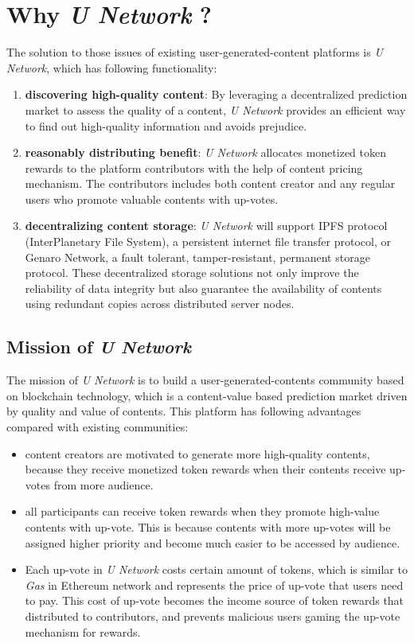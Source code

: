 \section{Why \emph{U Network} ?}
The solution to those issues of existing user-generated-content platforms is \emph{U Network}, which has following functionality:
\begin{enumerate}
    
    \item \textbf{discovering high-quality content}: By leveraging a decentralized prediction market to assess the quality of a content, \emph{U Network} provides an efficient way to find out high-quality information and avoids prejudice.    
    \item \textbf{reasonably distributing benefit}:  \emph{U Network} allocates monetized token rewards to the platform contributors with the help of content pricing mechanism. The contributors includes both content creator and any regular users who promote valuable contents with up-votes.
    
    \item \textbf{decentralizing content storage}: \emph{U Network} will support IPFS protocol (InterPlanetary File System\cite{ipfs}), a persistent internet file transfer protocol, or Genaro Network, a fault tolerant, tamper-resistant, permanent storage protocol. These decentralized storage solutions not only improve the reliability of data integrity but also guarantee the availability of contents using redundant copies across distributed server nodes.       
\end{enumerate}

\subsection{Mission of \emph{U Network}}
The mission of \emph{U Network} is to build a user-generated-contents community based on blockchain technology, which is a content-value based prediction market driven by quality and value of contents. This platform has following advantages compared with existing communities:
\begin{itemize}
\item content creators are motivated to generate more high-quality contents, because they receive monetized token rewards when their contents receive up-votes from more audience. 
\item all participants can receive token rewards when they promote high-value contents with up-vote. This is because contents with more up-votes will be assigned higher priority and become much easier to be accessed by audience.
\item Each up-vote in  \emph{U Network} costs certain amount of tokens, which is similar to \emph{Gas} in Ethereum network and represents the price of up-vote that users need to pay. This cost of up-vote becomes the income source of token rewards that distributed to contributors, and prevents malicious users gaming the up-vote mechanism for rewards. 
\end{itemize}

